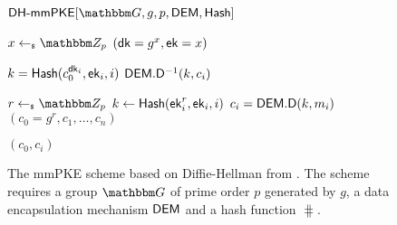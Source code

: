 \begin{figure}[!tbp]
  \center
  \begin{algobox}{$\dhmmpke[\Grp, g, p, \dem, \hash]$}
    \begin{minipage}[t]{.49\linewidth}
      \algoHead{\mmpkeKeyGen}
      \begin{algorithmic}
        \State $x\getsr \Z_p$
        \State \Return $({\mathsf{dk}}= g^x, {\mathsf{ek}}=x)$
      \end{algorithmic}
      \medskip
      \begin{algorithmic}
        \State $k = {\mathsf{Hash}}(c_0^{{\mathsf{dk}}_i}, {\mathsf{ek}}_i, i)$
        \State \Return ${\mathsf{DEM}}.{\mathsf{D}}^{-1}(k, c_i)$
      \end{algorithmic}
    \end{minipage}
    \hfill
    \begin{minipage}[t]{.49\linewidth}
      \begin{algorithmic}
        \State $r \getsr \Z_p$
          \State $k \gets {\ensuremath{\mathsf{Hash}}}({\mathsf{ek}}_i^r, {\mathsf{ek}}_i, i)$
          \State $c_i = {\mathsf{DEM}}.{\mathsf{D}}(k, m_i)$
        \EndFor
        \State \mbox{\Return $(c_0=g^r,c_1,\ldots,c_n)$}
      \end{algorithmic}

      \begin{algorithmic}
        \State \Return $(c_0, c_i)$
      \end{algorithmic}
    \end{minipage}
  \end{algobox}
  \caption{The mmPKE scheme based on Diffie-Hellman from \cite{ASIACCS:PinPoeSch14}. The scheme requires a group $\Grp$ of
    prime order $p$ generated by $g$, a data encapsulation mechanism ${\mathsf{DEM}}$ and a hash function $\hash$.}
  \label{fig:mmpke_constr}
\end{figure}


\label{sec:app-mmpke}
\mmpkeSecurity*

